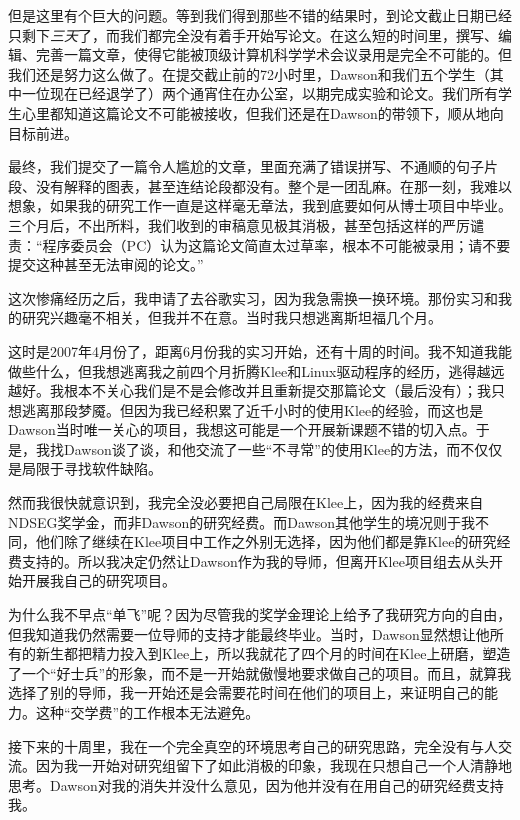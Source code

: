 \documentclass[letter,12pt]{book}
\begin{document}
\begin{CJK}{UTF8}{gbsn}
但是这里有个巨大的问题。等到我们得到那些不错的结果时，到论文截止日期已经只剩下\emph{三天}了，而我们都完全没有着手开始写论文。在这么短的时间里，撰写、编辑、完善一篇文章，使得它能被顶级计算机科学学术会议录用是完全不可能的。但我们还是努力这么做了。在提交截止前的72小时里，Dawson和我们五个学生（其中一位现在已经退学了）两个通宵住在办公室，以期完成实验和论文。我们所有学生心里都知道这篇论文不可能被接收，但我们还是在Dawson的带领下，顺从地向目标前进。

最终，我们提交了一篇令人尴尬的文章，里面充满了错误拼写、不通顺的句子片段、没有解释的图表，甚至连结论段都没有。整个是一团乱麻。在那一刻，我难以想象，如果我的研究工作一直是这样毫无章法，我到底要如何从博士项目中毕业。三个月后，不出所料，我们收到的审稿意见极其消极，甚至包括这样的严厉谴责：“程序委员会（PC）认为这篇论文简直太过草率，根本不可能被录用；请不要提交这种甚至无法审阅的论文。”

\breakline

这次惨痛经历之后，我申请了去谷歌实习，因为我急需换一换环境。那份实习和我的研究兴趣毫不相关，但我并不在意。当时我只想逃离斯坦福几个月。

这时是2007年4月份了，距离6月份我的实习开始，还有十周的时间。我不知道我能做些什么，但我想逃离我之前四个月折腾Klee和Linux驱动程序的经历，逃得越远越好。我根本不关心我们是不是会修改并且重新提交那篇论文（最后没有）；我只想逃离那段梦魇。但因为我已经积累了近千小时的使用Klee的经验，而这也是Dawson当时唯一关心的项目，我想这可能是一个开展新课题不错的切入点。于是，我找Dawson谈了谈，和他交流了一些“不寻常”的使用Klee的方法，而不仅仅是局限于寻找软件缺陷。

然而我很快就意识到，我完全没必要把自己局限在Klee上，因为我的经费来自NDSEG奖学金，而非Dawson的研究经费。而Dawson其他学生的境况则于我不同，他们除了继续在Klee项目中工作之外别无选择，因为他们都是靠Klee的研究经费支持的。所以我决定仍然让Dawson作为我的导师，但离开Klee项目组去从头开始开展我自己的研究项目。

为什么我不早点“单飞”呢？因为尽管我的奖学金理论上给予了我研究方向的自由，但我知道我仍然需要一位导师的支持才能最终毕业。当时，Dawson显然想让他所有的新生都把精力投入到Klee上，所以我就花了四个月的时间在Klee上研磨，塑造了一个“好士兵”的形象，而不是一开始就傲慢地要求做自己的项目。而且，就算我选择了别的导师，我一开始还是会需要花时间在他们的项目上，来证明自己的能力。这种“交学费”的工作根本无法避免。

接下来的十周里，我在一个完全真空的环境思考自己的研究思路，完全没有与人交流。因为我一开始对研究组留下了如此消极的印象，我现在只想自己一个人清静地思考。Dawson对我的消失并没什么意见，因为他并没有在用自己的研究经费支持我。


\end{CJK}
\end{document}

